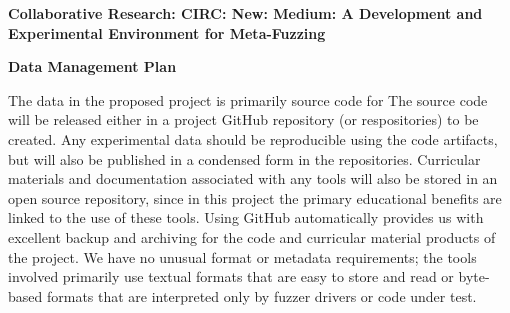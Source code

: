 \documentclass[12pt]{article}
\begin{document}
\begin{center}
{\Large\sf\textbf{Collaborative Research: CIRC: New: Medium: A Development and 
    Experimental Environment for Meta-Fuzzing
  }}
\end{center}

\begin{center}
{\sf\textbf{Data Management Plan
  }}
\end{center}
The data in the proposed project is primarily source code for The source code will be
released either in a project GitHub repository (or respositories) to be created. Any experimental data should be reproducible using the code artifacts, but will also be published in a
condensed form in the repositories.
Curricular materials and documentation associated with any tools will also be stored in
an open source repository, since in this project the primary educational benefits are linked
to the use of these tools. Using GitHub automatically provides us with excellent backup and
archiving for the code and curricular material products of the project.
We have no unusual format or metadata requirements; the tools involved primarily use
textual formats that are easy to store and read or byte-based formats that are interpreted
only by fuzzer drivers or code under test.
\end{document}
